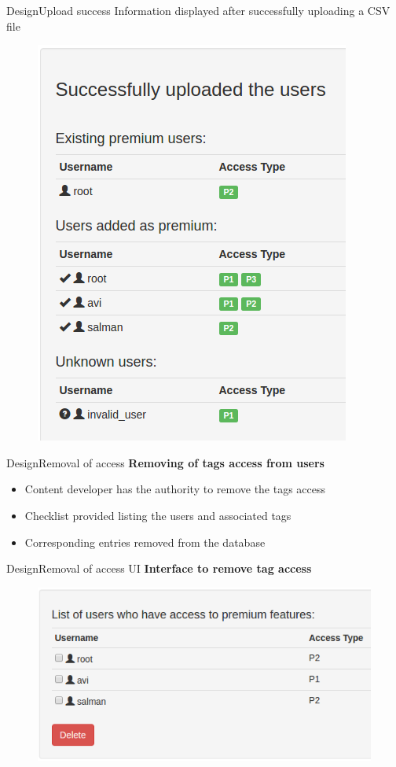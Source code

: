 \documentclass[xcolor=table]{beamer}
\begin{document}
\begin{frame}{Design}{Upload success}
	Information displayed after successfully uploading a CSV file\vspace{-0.1in}
	\begin{figure}
	\centering
	\includegraphics[width=0.4\linewidth]{./media/usertaguploadsuccess}
	\label{fig:usertaguploadsuccess}
	\end{figure}
\end{frame}

\begin{frame}{Design}{Removal of access}
\textbf{Removing of tags access from users}
	\begin{itemize}
		\item Content developer has the authority to remove the tags access
		\item Checklist provided listing the users and associated tags
		\item Corresponding entries removed from the database
	\end{itemize}
\end{frame}

\begin{frame}{Design}{Removal of access UI}
\textbf{Interface to remove tag access}
	\begin{figure}
	\centering
	\includegraphics[width=0.6\linewidth]{media/removeusers}
	\label{fig:removeusers}
	\end{figure}
\end{frame}
\end{document}
